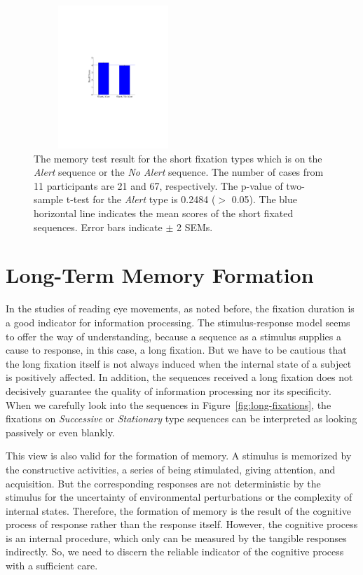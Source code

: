 \documentclass[10pt,letterpaper]{article}
\begin{document}
\begin{figure}
  \centerline{\includegraphics[width=60mm,height=54mm,trim=65mm 103mm 68mm 100mm]{./eps/memtest_short.pdf}}
  \caption{The memory test result for the short fixation types which is on the \textit{Alert} sequence or the \textit{No Alert} sequence. The number of cases from 11 participants are 21 and 67, respectively. The p-value of two-sample t-test for the \textit{Alert} type is 0.2484 ($>$ 0.05). The blue horizontal line indicates the mean scores of the short fixated sequences. Error bars indicate $\pm$ 2 SEMs.}
  \label{fig:memtest-short}
\end{figure}



\section{Long-Term Memory Formation}

In the studies of reading eye movements, as noted before, the fixation duration is a good indicator for information processing. The stimulus-response model seems to offer the way of understanding, because a sequence as a stimulus supplies a cause to response, in this case, a long fixation. But we have to be cautious that the long fixation itself is not always induced when the internal state of a subject is positively affected. In addition, the sequences received a long fixation does not decisively guarantee the quality of information processing nor its specificity. When we carefully look into the sequences in Figure~\ref{fig:long-fixations}, the fixations on \textit{Successive} or \textit{Stationary} type sequences can be interpreted as looking passively or even blankly.

This view is also valid for the formation of memory. A stimulus is memorized by the constructive activities, a series of being stimulated, giving attention, and acquisition. But the corresponding responses are not deterministic by the stimulus for the uncertainty of environmental perturbations or the complexity of internal states. Therefore, the formation of memory is the result of the cognitive process of response rather than the response itself. However, the cognitive process is an internal procedure, which only can be measured by the tangible responses indirectly. So, we need to discern the reliable indicator of the cognitive process with a sufficient care.
\end{document}
